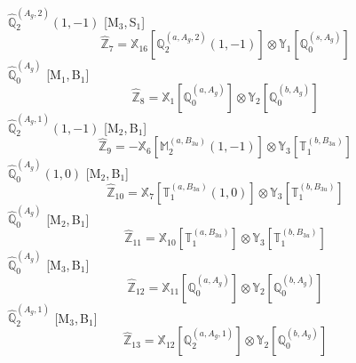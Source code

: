 \documentclass[fleqn,10pt,landscape]{article}
\begin{document}
\begin{itemize}
\vspace{4mm}
\noindent {} $\,\,\,\hat{\mathbb{Q}}_{2}^{(A_{g},2)}(1,-1)$ [M$_{3}$,\,S$_{1}$]
\begin{dmath*}
\hat{\mathbb{Z}}_{7}=\mathbb{X}_{16}[\mathbb{Q}_{2}^{(a,A_{g},2)}(1,-1)] \otimes\mathbb{Y}_{1}[\mathbb{Q}_{0}^{(s,A_{g})}]
\end{dmath*}
\vspace{4mm}
\noindent {} $\,\,\,\hat{\mathbb{Q}}_{0}^{(A_{g})}$ [M$_{1}$,\,B$_{1}$]
\begin{dmath*}
\hat{\mathbb{Z}}_{8}=\mathbb{X}_{1}[\mathbb{Q}_{0}^{(a,A_{g})}] \otimes\mathbb{Y}_{2}[\mathbb{Q}_{0}^{(b,A_{g})}]
\end{dmath*}
\vspace{4mm}
\noindent {} $\,\,\,\hat{\mathbb{Q}}_{2}^{(A_{g},1)}(1,-1)$ [M$_{2}$,\,B$_{1}$]
\begin{dmath*}
\hat{\mathbb{Z}}_{9}=- \mathbb{X}_{6}[\mathbb{M}_{2}^{(a,B_{3u})}(1,-1)] \otimes\mathbb{Y}_{3}[\mathbb{T}_{1}^{(b,B_{3u})}]
\end{dmath*}
\vspace{4mm}
\noindent {} $\,\,\,\hat{\mathbb{Q}}_{0}^{(A_{g})}(1,0)$ [M$_{2}$,\,B$_{1}$]
\begin{dmath*}
\hat{\mathbb{Z}}_{10}=\mathbb{X}_{7}[\mathbb{T}_{1}^{(a,B_{3u})}(1,0)] \otimes\mathbb{Y}_{3}[\mathbb{T}_{1}^{(b,B_{3u})}]
\end{dmath*}
\vspace{4mm}
\noindent {} $\,\,\,\hat{\mathbb{Q}}_{0}^{(A_{g})}$ [M$_{2}$,\,B$_{1}$]
\begin{dmath*}
\hat{\mathbb{Z}}_{11}=\mathbb{X}_{10}[\mathbb{T}_{1}^{(a,B_{3u})}] \otimes\mathbb{Y}_{3}[\mathbb{T}_{1}^{(b,B_{3u})}]
\end{dmath*}
\vspace{4mm}
\noindent {} $\,\,\,\hat{\mathbb{Q}}_{0}^{(A_{g})}$ [M$_{3}$,\,B$_{1}$]
\begin{dmath*}
\hat{\mathbb{Z}}_{12}=\mathbb{X}_{11}[\mathbb{Q}_{0}^{(a,A_{g})}] \otimes\mathbb{Y}_{2}[\mathbb{Q}_{0}^{(b,A_{g})}]
\end{dmath*}
\vspace{4mm}
\noindent {} $\,\,\,\hat{\mathbb{Q}}_{2}^{(A_{g},1)}$ [M$_{3}$,\,B$_{1}$]
\begin{dmath*}
\hat{\mathbb{Z}}_{13}=\mathbb{X}_{12}[\mathbb{Q}_{2}^{(a,A_{g},1)}] \otimes\mathbb{Y}_{2}[\mathbb{Q}_{0}^{(b,A_{g})}]
\end{dmath*}
\vspace{4mm}

\end{itemize}
\end{document}

